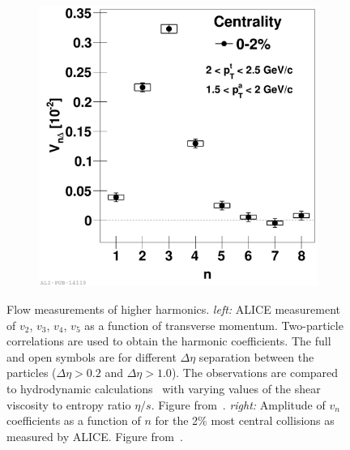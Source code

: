 \begin{figure}[tb]
\begin{subfigure}[t]{0.45\textwidth}
        \includegraphics[width=\textwidth]{figures/2012-Jun-06-fig02b}
        \label{fig:alicepowers}

        \end{subfigure} 
        
                \caption[Flow measurements of higher harmonics]{Flow measurements of higher harmonics. \emph{left:} ALICE measurement of $v_2$, $v_3$, $v_4$, $v_5$ as a function of transverse momentum. Two-particle correlations are used to obtain the harmonic coefficients. The full and open symbols are for different $\Delta\eta$ separation between the particles ($\Delta\eta > 0.2$ and $\Delta\eta > 1.0$). The observations are compared to hydrodynamic calculations~\cite{Schenke:2011tv} with varying values of the shear viscosity to entropy ratio $\eta/s$. Figure from~\cite{PRL107032301}. \emph{right:} Amplitude of $v_n$ coefficients as a function of $n$ for the 2\% most central collisions as measured by ALICE. Figure from~\cite{Aamodt2012249}. }
                \label{fig:vnpowers}

\end{figure}


